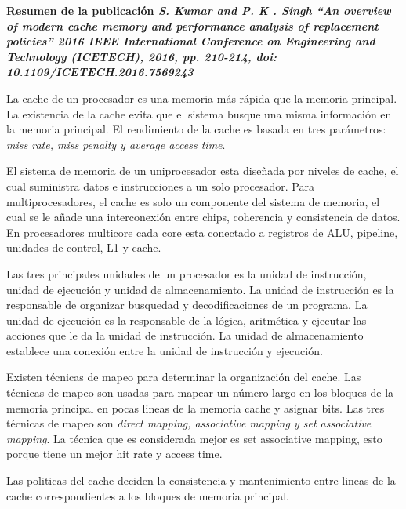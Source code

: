 \item \textbf{Resumen de la publicación \textit{S. Kumar and P. K . Singh ``An overview of modern cache memory and performance analysis of replacement policies'' 2016 IEEE International Conference on Engineering and Technology (ICETECH), 2016, pp. 210-214, doi: 10.1109/ICETECH.2016.7569243}}

La cache de un procesador es una memoria más rápida que la memoria principal. La existencia de la cache evita que el sistema busque una misma información en la memoria principal. El rendimiento de la cache es basada en tres parámetros: \textit{miss rate, miss penalty y average access time}.

El sistema de memoria de un uniprocesador esta diseñada por niveles de cache, el cual suministra datos e instrucciones a un solo procesador. Para multiprocesadores, el cache es solo un componente del sistema de memoria, el cual se le añade una interconexión entre chips, coherencia y consistencia de datos. En procesadores multicore cada core esta conectado a registros de ALU, pipeline, unidades de control, L1 y cache.

Las tres principales unidades de un procesador es la unidad de instrucción, unidad de ejecución y unidad de almacenamiento. La unidad de instrucción es la responsable de organizar busquedad y decodificaciones de un programa. La unidad de ejecución es la responsable de la lógica, aritmética y ejecutar las acciones que le da la unidad de instrucción. La unidad de almacenamiento establece una conexión entre la unidad de instrucción y ejecución.

Existen técnicas de mapeo para determinar la organización del cache. Las técnicas de mapeo son usadas para mapear un número largo en los bloques de la memoria principal en pocas lineas de la memoria cache y asignar bits. Las tres técnicas de mapeo son \textit{direct mapping, associative mapping y set associative mapping}. La técnica que es considerada mejor es set associative mapping, esto porque tiene un mejor hit rate y access time.

Las politicas del cache deciden la consistencia y mantenimiento entre lineas de la cache correspondientes a los bloques de memoria principal.